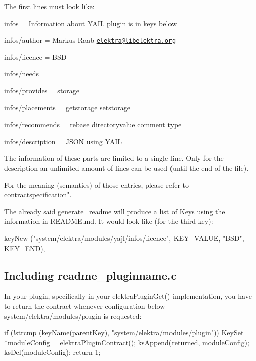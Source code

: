 The first lines must look like\+:


\begin{DoxyItemize}
\item infos = Information about Y\+A\+I\+L plugin is in keys below
\item infos/author = Markus Raab \href{mailto:elektra@libelektra.org}{\tt elektra@libelektra.\+org}
\item infos/licence = B\+S\+D
\item infos/needs =
\item infos/provides = storage
\item infos/placements = getstorage setstorage
\item infos/recommends = rebase directoryvalue comment type
\item infos/description = J\+S\+O\+N using Y\+A\+I\+L
\end{DoxyItemize}

The information of these parts are limited to a single line. Only for the description an unlimited amount of lines can be used (until the end of the file).

For the meaning (semantics) of those entries, please refer to contractspecification".

The already said generate\+\_\+readme will produce a list of Keys using the information in R\+E\+A\+D\+M\+E.\+md. It would look like (for the third key)\+: \begin{DoxyVerb}            keyNew ("system/elektra/modules/yajl/infos/licence",
                    KEY_VALUE, "BSD", KEY_END),
\end{DoxyVerb}


\subsection*{Including readme\+\_\+pluginname.\+c}

In your plugin, specifically in your elektra\+Plugin\+Get() implementation, you have to return the contract whenever configuration below system/elektra/modules/plugin is requested\+: \begin{DoxyVerb}    if (!strcmp (keyName(parentKey), "system/elektra/modules/plugin"))
    {
            KeySet *moduleConfig = elektraPluginContract();
            ksAppend(returned, moduleConfig);
            ksDel(moduleConfig);
            return 1;
    }
\end{DoxyVerb}


